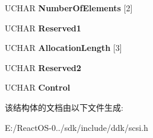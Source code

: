 \begin{DoxyCompactItemize}
U\+C\+H\+AR {\bfseries Number\+Of\+Elements} \mbox{[}2\mbox{]}
\item 
\mbox{\label{struct___c_d_b_1_1___r_e_a_d___e_l_e_m_e_n_t___s_t_a_t_u_s_ad6f63d9f0b960a4fad27d69506ecc617}} 
U\+C\+H\+AR {\bfseries Reserved1}
\item 
\mbox{\label{struct___c_d_b_1_1___r_e_a_d___e_l_e_m_e_n_t___s_t_a_t_u_s_a6fe0f48febde6deabb4dd8d27e4016f6}} 
U\+C\+H\+AR {\bfseries Allocation\+Length} \mbox{[}3\mbox{]}
\item 
\mbox{\label{struct___c_d_b_1_1___r_e_a_d___e_l_e_m_e_n_t___s_t_a_t_u_s_a31aee5601fb35792ed266edb97776271}} 
U\+C\+H\+AR {\bfseries Reserved2}
\item 
\mbox{\label{struct___c_d_b_1_1___r_e_a_d___e_l_e_m_e_n_t___s_t_a_t_u_s_a339d8d323f797cdf49cdd9dda487ef43}} 
U\+C\+H\+AR {\bfseries Control}
\end{DoxyCompactItemize}


该结构体的文档由以下文件生成\+:\begin{DoxyCompactItemize}
\item 
E\+:/\+React\+O\+S-\/0../sdk/include/ddk/scsi.\+h\end{DoxyCompactItemize}
